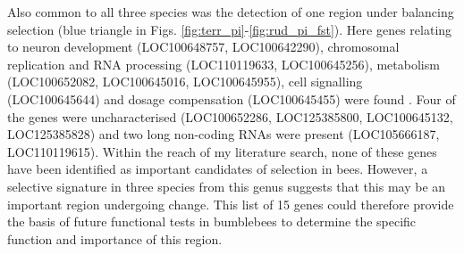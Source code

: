 \documentclass[12pt]{article}
\begin{document}
\begin{linenumbers}

		Also common to all three species was the detection of one region under balancing selection (blue triangle in Figs. \ref{fig:terr_pi}-\ref{fig:rud_pi_fst}). 
		Here genes relating to neuron development (LOC100648757,
		LOC100642290), chromosomal replication and RNA processing (LOC110119633, \linebreak LOC100645256), metabolism (LOC100652082, LOC100645016,
		LOC100645955), cell signalling (LOC100645644) and dosage compensation (LOC100645455) were found \citep{manak_mutation_2002, walker_reduced_2006, saint-pol_new_2017, diao_genomic_2018}. Four of the genes were uncharacterised (LOC100652286, LOC125385800, LOC100645132, LOC125385828) and two long non-coding RNAs were present (LOC105666187, LOC110119615). Within the reach of my literature search, none of these genes have been identified as important candidates of selection in bees. However, a selective signature in three species from this genus suggests that this may be an important region undergoing change. 
		This list of 15 genes could therefore provide the basis of future functional tests in bumblebees to determine the specific function and importance of this region.

%



\end{linenumbers}
\end{document}
